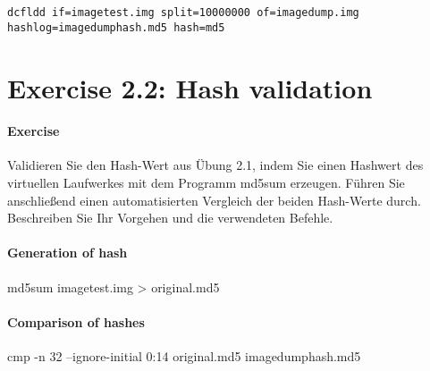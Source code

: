 \documentclass[10pt,a4paper]{article}
\begin{document}
\Verb+dcfldd if=imagetest.img split=10000000 of=imagedump.img hashlog=imagedumphash.md5 hash=md5+

\section{Exercise 2.2: Hash validation}

\paragraph{Exercise}
Validieren Sie den Hash-Wert aus Übung 2.1, indem Sie einen Hashwert des virtuellen Laufwerkes mit dem Programm
md5sum erzeugen. Führen Sie anschließend einen automatisierten Vergleich der beiden Hash-Werte durch. Beschreiben
Sie Ihr Vorgehen und die verwendeten Befehle.

\paragraph{Generation of hash}
md5sum imagetest.img > original.md5

\paragraph{Comparison of hashes}
cmp -n 32 --ignore-initial 0:14 original.md5 imagedumphash.md5



\end{document}
